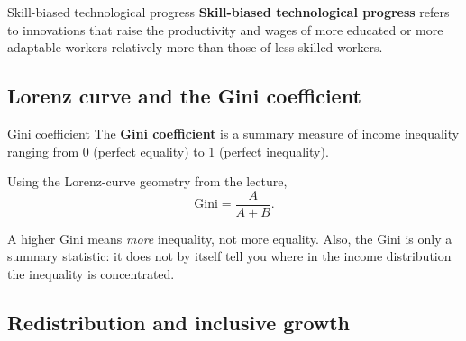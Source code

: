\documentclass[12pt]{article}
\begin{document}
\begin{definition}{Skill-biased technological progress}{}
\textbf{Skill-biased technological progress} refers to innovations that raise the productivity and wages of more educated or more adaptable workers relatively more than those of less skilled workers.
\end{definition}

\subsection{Lorenz curve and the Gini coefficient}

\begin{definition}{Gini coefficient}{}
The \textbf{Gini coefficient} is a summary measure of income inequality ranging from 0 (perfect equality) to 1 (perfect inequality).
\end{definition}

\begin{center}
\end{center}

Using the Lorenz-curve geometry from the lecture,
\[
\text{Gini}=\frac{A}{A+B}.
\]

\begin{commonmistake}
A higher Gini means \emph{more} inequality, not more equality. Also, the Gini is only a summary statistic: it does not by itself tell you where in the income distribution the inequality is concentrated.
\end{commonmistake}

\subsection{Redistribution and inclusive growth}
\end{document}
